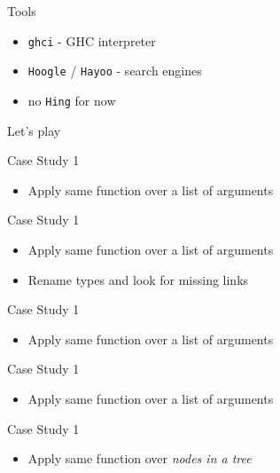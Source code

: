 \documentclass{beamer}
\begin{document}
\begin{frame}{Tools}
  \begin{itemize}[<+->]
    \item \texttt{ghci} - GHC interpreter
    \item \texttt{Hoogle} / \texttt{Hayoo} - search engines
    \item no \texttt{Hing} for now
  \end{itemize}
  \pause
  Let's play
\end{frame}

\begin{frame}{Case Study 1}
  \begin{itemize}
    \item Apply same function over a list of arguments
  \end{itemize}
  
\end{frame}

\begin{frame}{Case Study 1}
  \begin{itemize}
    \item Apply same function over a list of arguments
    \item Rename types and look for missing links
  \end{itemize}
  
\end{frame}

\begin{frame}{Case Study 1}
  \begin{itemize}
    \item Apply same function over a list of arguments
  \end{itemize}
  
\end{frame}

\begin{frame}{Case Study 1}
  \begin{itemize}
    \item Apply same function over a list of arguments
  \end{itemize}
  
\end{frame}

\begin{frame}{Case Study 1}
  \begin{itemize}
    \item Apply same function over \textit{nodes in a tree}
  \end{itemize}
  
\end{frame}
\end{document}
